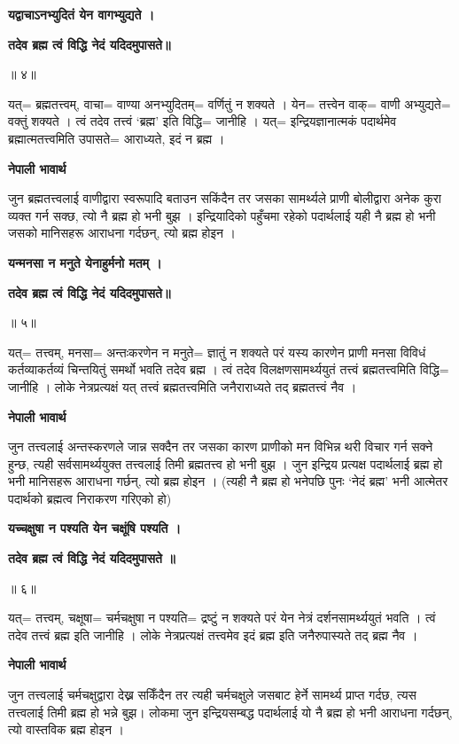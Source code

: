 \documentclass[11pt, a5paper]{article}
\begin{document}
\textbf{यद्वाचाऽनभ्युदितं येन वागभ्युद्यते ।}

\textbf{तदेव ब्रह्म त्वं विद्धि नेदं यदिदमुपासते॥}

॥ ४॥

यत्= ब्रह्मतत्त्वम्, वाचा= वाण्या अनभ्युदितम्= वर्णितुं न शक्यते । येन= तत्त्वेन वाक्= वाणी अभ्युद्यते= वक्तुं शक्यते । त्वं तदेव तत्त्वं ‘ब्रह्म’ इति विद्धि= जानीहि । यत्= इन्द्रियज्ञानात्मकं पदार्थमेव ब्रह्मात्मतत्त्वमिति उपासते= आराध्यते, इदं न ब्रह्म ।

\textbf{नेपाली भावार्थ}

जुन ब्रह्मतत्त्वलाई वाणीद्वारा स्वरूपादि बताउन सकिंदैन तर जसका सामर्थ्यले प्राणी बोलीद्वारा अनेक कुरा व्यक्त गर्न सक्छ, त्यो नै ब्रह्म हो भनी बुझ । इन्द्रियादिको पहुँचमा रहेको पदार्थलाई यही नै ब्रह्म हो भनी जसको मानिसहरू आराधना गर्दछन्, त्यो ब्रह्म होइन ।

\textbf{यन्मनसा न मनुते येनाहुर्मनो मतम् ।}

\textbf{तदेव ब्रह्म त्वं विद्धि नेदं यदिदमुपासते॥}

॥ ५॥

यत्= तत्त्वम्, मनसा= अन्तःकरणेन न मनुते= ज्ञातुं न शक्यते परं यस्य कारणेन प्राणी मनसा विविधं कर्तव्याकर्तव्यं चिन्तयितुं समर्थो भवति तदेव ब्रह्म । त्वं तदेव विलक्षणसामर्थ्ययुतं तत्त्वं ब्रह्मतत्त्वमिति विद्धि= जानीहि । लोके नेत्रप्रत्यक्षं यत् तत्त्वं ब्रह्मतत्त्वमिति जनैराराध्यते तद् ब्रह्मतत्त्वं नैव ।

\textbf{नेपाली भावार्थ}

जुन तत्त्वलाई अन्तस्करणले जान्न सक्दैन तर जसका कारण प्राणीको मन विभिन्न थरी विचार गर्न सक्ने हुन्छ, त्यही सर्वसामर्थ्ययुक्त तत्त्वलाई तिमी ब्रह्मतत्त्व हो भनी बुझ । जुन इन्द्रिय प्रत्यक्ष पदार्थलाई ब्रह्म हो भनी मानिसहरू आराधना गर्छन्, त्यो ब्रह्म होइन । (त्यही नै ब्रह्म हो भनेपछि पुनः ‘नेदं ब्रह्म’ भनी आत्मेतर पदार्थको ब्रह्मत्व निराकरण गरिएको हो)

\textbf{यच्चक्षुषा न पश्यति येन चक्षूंषि पश्यति ।}

\textbf{तदेव ब्रह्म त्वं विद्धि नेदं यदिदमुपासते ॥}

॥ ६॥

यत्= तत्त्वम्, चक्षूषा= चर्मचक्षुषा न पश्यति= द्रष्टुं न शक्यते परं येन नेत्रं दर्शनसामर्थ्ययुतं भवति । त्वं तदेव तत्त्वं ब्रह्म इति जानीहि । लोके नेत्रप्रत्यक्षं तत्त्वमेव इदं ब्रह्म इति जनैरुपास्यते तद् ब्रह्म नैव ।

\textbf{नेपाली भावार्थ}

जुन तत्त्वलाई चर्मचक्षुद्वारा देख्न सकिँदैन तर त्यही चर्मचक्षुले जसबाट हेर्ने सामर्थ्य प्राप्त गर्दछ, त्यस तत्त्वलाई तिमी ब्रह्म हो भन्ने बुझ। लोकमा जुन इन्द्रियसम्बद्ध पदार्थलाई यो नै ब्रह्म हो भनी आराधना गर्दछन्, त्यो वास्तविक ब्रह्म होइन ।
\end{document}
